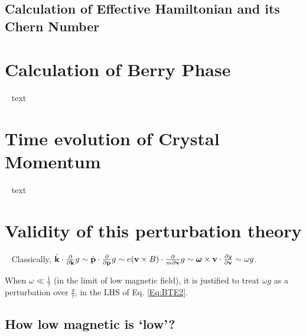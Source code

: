 \documentclass[aps,amsmath,prl]{revtex4-2}
\newcommand{\bvec}[1]{{\mathbf #1}}
\renewcommand\vec[1]{\ensuremath\boldsymbol{#1}} %
\begin{document}
\subsection{Calculation of Effective Hamiltonian and its Chern Number}

\appendix
\section{Calculation of Berry Phase}~\label{app:BerryPhase}
text
\section{Time evolution of Crystal Momentum}~\label{app:crystal-momentum-time-evolution}
text
\section{Validity of this perturbation theory}~\label{app:perturbation_validation}
Classically, $\dot{\bvec{k}}\cdot\frac{\partial}{\partial \bvec{k}} g \sim \dot{\bvec{p}}\cdot\frac{\partial}{\partial \bvec{p}} g \sim e (\bvec{v}\times{B})\cdot\frac{\partial}{m\partial \bvec{v}} g \sim \vec{\omega} \times \bvec{v}\cdot \frac{\partial g}{\partial \bvec{v}} \sim \omega g$.

When $\omega \ll \frac{1}{\tau}$ (in the limit of low magnetic field), it is justified to treat $\omega g$ as a perturbation over $\frac{g}{\tau}$, in the LHS of Eq. \eqref{Eq:BTE2}.
\subsection{How low magnetic is `low'?}



\end{document}
